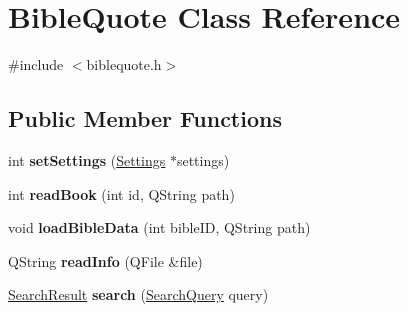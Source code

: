 \hypertarget{classBibleQuote}{
\section{BibleQuote Class Reference}
\label{classBibleQuote}
}


{\ttfamily \#include $<$biblequote.h$>$}\subsection*{Public Member Functions}
\begin{DoxyCompactItemize}
\item 
\hypertarget{classBibleQuote_a3d20c298cc87364e6fb9abc67352dfb9}{
int {\bfseries setSettings} (\hyperlink{classSettings}{Settings} $\ast$settings)}
\label{classBibleQuote_a3d20c298cc87364e6fb9abc67352dfb9}

\item 
\hypertarget{classBibleQuote_a42af21eb619fd89ef9bc3b6b574b0b6c}{
int {\bfseries readBook} (int id, QString path)}
\label{classBibleQuote_a42af21eb619fd89ef9bc3b6b574b0b6c}

\item 
\hypertarget{classBibleQuote_a0f9c1eb1346380d3f8e21c9cdf76390d}{
void {\bfseries loadBibleData} (int bibleID, QString path)}
\label{classBibleQuote_a0f9c1eb1346380d3f8e21c9cdf76390d}

\item 
\hypertarget{classBibleQuote_af4bd0be7d2ebf2b3fddc60757acf556a}{
QString {\bfseries readInfo} (QFile \&file)}
\label{classBibleQuote_af4bd0be7d2ebf2b3fddc60757acf556a}

\item 
\hypertarget{classBibleQuote_ab87214e63ac373631c5867e6d58cd69c}{
\hyperlink{classSearchResult}{SearchResult} {\bfseries search} (\hyperlink{classSearchQuery}{SearchQuery} query)}
\label{classBibleQuote_ab87214e63ac373631c5867e6d58cd69c}

\end{DoxyCompactItemize}
